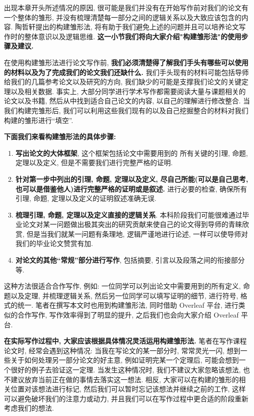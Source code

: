 \documentclass{booki}
\begin{document}
{出现本章开头所述情况的原因}, 很可能是我们并没有在开始写作前对我们的论文有一个整体的雏形, 并没有梳理清楚每一部分之间的逻辑关系以及大致应该包含的内容. 陶哲轩提出的构建雏形法, 将有助于我们避免上述的问题并且可以培养论文写作时的整体意识以及逻辑思维. {\textbf{这一小节我们将向大家介绍"构建雏形法"的使用步骤及建议.}} \par
在使用构建雏形法进行论文写作前, \textbf{我们必须清楚得了解我们手头有哪些可以使用的材料以及为了完成我们的论文我们还缺什么.} 我们手头现有的材料可能包括导师给我们的几篇参考论文以及研究的方向, 我们缺少的可能是支撑我们论文的关键定理以及相关数据. 事实上, 大部分同学进行学术写作都需要阅读大量与课题相关的论文以及书籍, 然后从中找到适合自己论文的内容, 以自己的理解进行修改整合. 当我们构建完雏形后, 我们可以利用这些我们现有的以及自己挖掘整合的材料对我们构建的雏形进行{``}填空''. \par
{\textbf{下面我们来看构建雏形法的具体步骤: }}
\begin{enumerate}
    \item \textbf{写出论文的大体框架}, 这个框架包括论文中需要用到的 所有关键的引理, 命题, 定理以及定义, 但是不需要我们进行完整严格的证明.
    \item \textbf{针对第一步中列出的引理, 命题, 定理以及定义, 尽自己所能(可以是自己思考, 也可以是借鉴他人)进行完整严格的证明或是叙述. }进行必要的检查, 确保所有引理, 命题, 定理以及定义的证明叙述准确无误.
    \item \textbf{梳理引理, 命题, 定理以及定义直接的逻辑关系}. 本科阶段我们可能很难通过毕业论文对某一问题做出极其突出的研究贡献来使自己的论文得到导师的青睐欣赏, 但是当我们就某一问题有条理地, 逻辑严谨地进行论述, 一样可以使导师对我们的毕业论文赞赏有加.
    \item \textbf{对论文的其他{``}常规''部分进行写作}, 包括摘要, 引言以及段落之间的衔接部分等.
\end{enumerate}
\par
这种方法很适合合作写作, 例如: 一位同学可以列出论文中需要用到的所有定义, 命题以及定理, 并梳理逻辑关系, 然后另一位同学可以填写证明的细节, 进行符号, 格式的统一. 笔者在撰写本文时也用到构建雏形法, 同时借助 Overleaf 平台, 进行类似的合作写作, 写作效率得到了明显的提升, 之后我们也会向大家介绍 Overleaf 平台. \par
\textbf{在实际写作过程中, 大家应该根据具体情况灵活运用构建雏形法. }笔者在写作课程论文时, 经常会遇到这种情况: 当我在写论文的某一部分时, 常常灵光一闪, 想到一些关于如何处理另一部分论文的好主意, 例如证明完某一个定理后, 可能会想到一个很好的例子去验证这一定理. 当发生这种情况时, 我们不建议大家忽略该想法, 也不建议放弃当前正在做的事情去落实这一想法. 相反, 大家可以在构建的雏形的相关位置对该想法进行标记, 然后我们可以暂时忘记该想法并继续之前的工作, 这样可以避免破坏我们的注意力或动力, 并且我们可以在写作过程中更合适的阶段重新考虑我们的想法.
\end{document}
